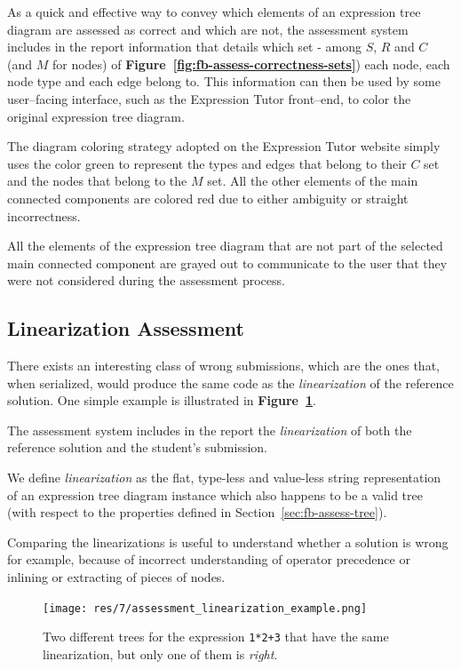 \begin{chapterBody}
As a quick and effective way to convey which elements of an expression tree 
diagram are assessed as correct and which are not, the assessment
system includes in the report information that details which set -
among $ S $, $ R $ and $ C $ (and $ M $ for nodes) of
\textbf{Figure~\ref{fig:fb-assess-correctness-sets}}) each node, each
node type and each edge belong to.
This information can then be used by some user–facing interface, such
as the Expression Tutor front–end, to color the original expression tree diagram.

The diagram coloring strategy adopted on the Expression Tutor website
simply uses the color green to represent the types and edges that belong
to their $ C $ set and the nodes that belong to the $ M $ set.
All the other elements of the main connected components are colored red
due to either ambiguity or straight incorrectness.

All the elements of the expression tree diagram that are not part of
the selected main connected component are grayed out to communicate
to the user that they were not considered during the assessment process.

\subsection{Linearization Assessment}\label{sec:fb-assess-linearization}

There exists an interesting class of wrong submissions, which are the ones
that, when serialized, would produce the same code as the
\textit{linearization} of the reference solution. One simple example is
illustrated in \textbf{Figure~\ref{fig:fb-assess-linearization-example}}.

The assessment system includes in the report the \textit{linearization}
of both the reference solution and the student's submission.

We define \textit{linearization} as the flat, type-less and value-less string
representation of an expression tree diagram instance which also happens to
be a valid tree (with respect to the properties defined in
Section~\ref{sec:fb-assess-tree}).

Comparing the linearizations is useful to understand whether a solution is
wrong for example, because of incorrect understanding of operator precedence
or inlining or extracting of pieces of nodes.

\begin{figure}[ht]
    \centering
    \texttt{[image: res/7/assessment\_linearization\_example.png]}
    \caption{Two different trees for the expression \texttt{1*2+3} that have the
same linearization, but only one of them is \textit{right}.}
    \label{fig:fb-assess-linearization-example}
\end{figure}


\end{chapterBody}
